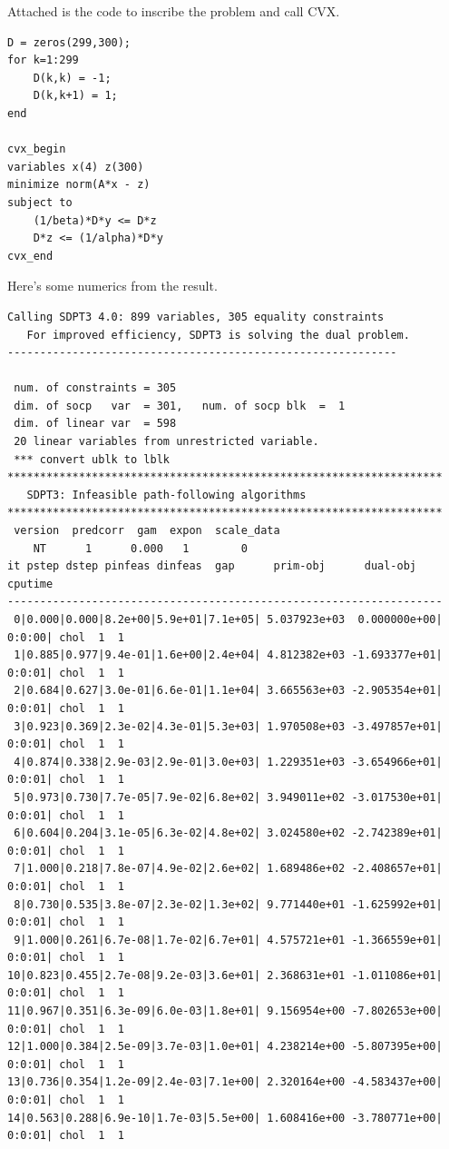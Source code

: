 \documentclass[12pt,a4paper]{article}
\begin{document}
Attached is the code to inscribe the problem and call CVX. 
\begin{verbatim}
D = zeros(299,300);
for k=1:299
    D(k,k) = -1;
    D(k,k+1) = 1;
end

cvx_begin
variables x(4) z(300)
minimize norm(A*x - z)
subject to 
    (1/beta)*D*y <= D*z
    D*z <= (1/alpha)*D*y
cvx_end
\end{verbatim}
Here's some numerics from the result.
\begin{verbatim}
Calling SDPT3 4.0: 899 variables, 305 equality constraints
   For improved efficiency, SDPT3 is solving the dual problem.
------------------------------------------------------------

 num. of constraints = 305
 dim. of socp   var  = 301,   num. of socp blk  =  1
 dim. of linear var  = 598
 20 linear variables from unrestricted variable.
 *** convert ublk to lblk
*******************************************************************
   SDPT3: Infeasible path-following algorithms
*******************************************************************
 version  predcorr  gam  expon  scale_data
    NT      1      0.000   1        0    
it pstep dstep pinfeas dinfeas  gap      prim-obj      dual-obj    cputime
-------------------------------------------------------------------
 0|0.000|0.000|8.2e+00|5.9e+01|7.1e+05| 5.037923e+03  0.000000e+00| 0:0:00| chol  1  1 
 1|0.885|0.977|9.4e-01|1.6e+00|2.4e+04| 4.812382e+03 -1.693377e+01| 0:0:01| chol  1  1 
 2|0.684|0.627|3.0e-01|6.6e-01|1.1e+04| 3.665563e+03 -2.905354e+01| 0:0:01| chol  1  1 
 3|0.923|0.369|2.3e-02|4.3e-01|5.3e+03| 1.970508e+03 -3.497857e+01| 0:0:01| chol  1  1 
 4|0.874|0.338|2.9e-03|2.9e-01|3.0e+03| 1.229351e+03 -3.654966e+01| 0:0:01| chol  1  1 
 5|0.973|0.730|7.7e-05|7.9e-02|6.8e+02| 3.949011e+02 -3.017530e+01| 0:0:01| chol  1  1 
 6|0.604|0.204|3.1e-05|6.3e-02|4.8e+02| 3.024580e+02 -2.742389e+01| 0:0:01| chol  1  1 
 7|1.000|0.218|7.8e-07|4.9e-02|2.6e+02| 1.689486e+02 -2.408657e+01| 0:0:01| chol  1  1 
 8|0.730|0.535|3.8e-07|2.3e-02|1.3e+02| 9.771440e+01 -1.625992e+01| 0:0:01| chol  1  1 
 9|1.000|0.261|6.7e-08|1.7e-02|6.7e+01| 4.575721e+01 -1.366559e+01| 0:0:01| chol  1  1 
10|0.823|0.455|2.7e-08|9.2e-03|3.6e+01| 2.368631e+01 -1.011086e+01| 0:0:01| chol  1  1 
11|0.967|0.351|6.3e-09|6.0e-03|1.8e+01| 9.156954e+00 -7.802653e+00| 0:0:01| chol  1  1 
12|1.000|0.384|2.5e-09|3.7e-03|1.0e+01| 4.238214e+00 -5.807395e+00| 0:0:01| chol  1  1 
13|0.736|0.354|1.2e-09|2.4e-03|7.1e+00| 2.320164e+00 -4.583437e+00| 0:0:01| chol  1  1 
14|0.563|0.288|6.9e-10|1.7e-03|5.5e+00| 1.608416e+00 -3.780771e+00| 0:0:01| chol  1  1 

\end{verbatim}
\end{document}
